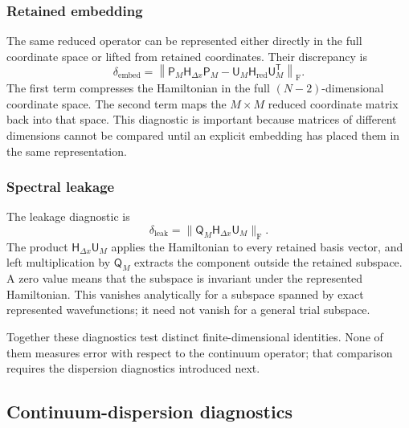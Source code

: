 \documentclass[11pt]{article}
\newcommand{\fro}{\mathrm{F}}
\newcommand{\mat}[1]{\mathsf{#1}}
\begin{document}
\subsubsection{Retained embedding}

The same reduced operator can be represented either directly in the full coordinate
space or lifted from retained coordinates. Their discrepancy is
\begin{equation}
 \delta_{\mathrm{embed}}
 =\left\lVert\mat{P}_M\mat{H}_{\Delta x}\mat{P}_M
 -\mat{U}_M\mat{H}_{\mathrm{red}}\mat{U}_M^{\mathsf T}\right\rVert_{\fro}.
 \label{eq:retained-embedding-diagnostic}
\end{equation}
The first term compresses the Hamiltonian in the full $(N-2)$-dimensional coordinate
space. The second term maps the $M\times M$ reduced coordinate matrix back into that
space. This diagnostic is important because matrices of different dimensions cannot
be compared until an explicit embedding has placed them in the same representation.

\subsubsection{Spectral leakage}

The leakage diagnostic is
\begin{equation}
 \delta_{\mathrm{leak}}
 =\lVert\mat{Q}_M\mat{H}_{\Delta x}\mat{U}_M\rVert_{\fro}.
 \label{eq:spectral-leakage-diagnostic}
\end{equation}
The product $\mat{H}_{\Delta x}\mat{U}_M$ applies the Hamiltonian to every retained
basis vector, and left multiplication by $\mat{Q}_M$ extracts the component outside
the retained subspace. A zero value means that the subspace is invariant under the
represented Hamiltonian. This vanishes analytically for a subspace spanned by exact represented
wavefunctions; it need not vanish for a general trial subspace.

Together these diagnostics test distinct finite-dimensional identities. None of them
measures error with respect to the continuum operator; that comparison requires the
dispersion diagnostics introduced next.

\subsection{Continuum-dispersion diagnostics}
\end{document}
